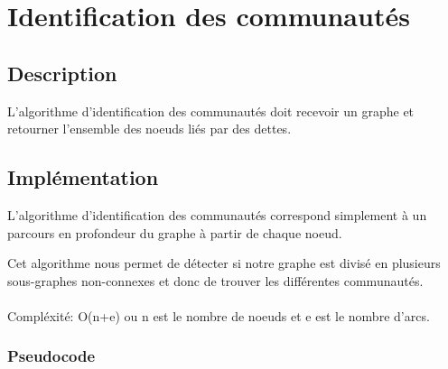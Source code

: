 \documentclass[12pt, oneside]{article}
\begin{document}
\FloatBarrier
\section{Identification des communautés}

\subsection{Description}
L'algorithme d'identification des communautés doit recevoir un graphe et retourner l'ensemble des noeuds liés par des dettes.
\subsection{Implémentation}

L'algorithme d'identification des communautés correspond simplement à un parcours en profondeur du graphe à partir de chaque noeud.

Cet algorithme nous permet de détecter si notre graphe est divisé en plusieurs sous-graphes non-connexes et donc de trouver les différentes communautés.\\\\
Compléxité: O(n+e) ou n est le nombre de noeuds et e est le nombre d'arcs.
\subsubsection{Pseudocode}
\begin{algorithm}
\end{algorithm}
 
\begin{algorithm}
\end{algorithm}
\newpage
\end{document}
